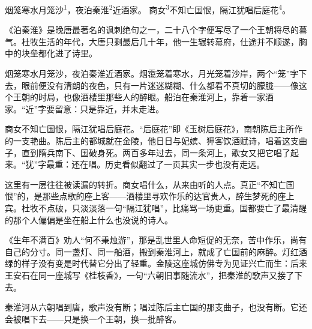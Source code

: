 
\begin{poem}
烟笼寒水月笼沙\textsuperscript{1}，夜泊秦淮\textsuperscript{2}近酒家。
商女\textsuperscript{3}不知亡国恨，隔江犹唱后庭花\textsuperscript{4}。
\end{poem}

\begin{annotations}
\end{annotations}

\begin{appreciation}
《泊秦淮》是晚唐最著名的讽刺绝句之一，二十八个字便写尽了一个王朝将尽的暮气。杜牧生活的年代，大唐只剩最后几十年，他一生辗转幕府，仕途并不顺遂，胸中的块垒都化进了诗里。

烟笼寒水月笼沙，夜泊秦淮近酒家。烟霭笼着寒水，月光笼着沙岸，两个“笼”字下去，眼前便没有清朗的夜色，只有一片迷迷糊糊、什么都看不真切的朦胧——像这个王朝的时局，也像酒楼里那些人的醉眼。船泊在秦淮河上，靠着一家酒家。“近”字要留意：只是靠近，并未走进。

商女不知亡国恨，隔江犹唱后庭花。“后庭花”即《玉树后庭花》，南朝陈后主所作的一支艳曲。陈后主的都城就在金陵，他日日与妃嫔、狎客饮酒赋诗，唱着这支曲子，直到隋兵南下、国破身死。两百多年过去，同一条河上，歌女又把它唱了起来。“犹”字最重：还在唱。历史看似翻过了一页其实一步也没有走远。

这里有一层往往被读漏的转折。商女唱什么，从来由听的人点。真正“不知亡国恨”的，是那些点歌的座上客——酒楼里寻欢作乐的达官贵人，醉生梦死的座上宾。杜牧不点破，只淡淡落一句“隔江犹唱”，比痛骂一场更重。国都要亡了最清醒的那个人偏偏是坐在船上什么也没说的诗人。

《生年不满百》劝人“何不秉烛游”，那是乱世里人命短促的无奈，苦中作乐，尚有自己的分寸。同一盏灯、同一船酒，搬到秦淮河上，就成了亡国前的麻醉。灯红酒绿的样子没有变是时代替它分出了轻重。金陵这座城仿佛专为见证兴亡而生：后来王安石在同一座城写《桂枝香》，一句“六朝旧事随流水”，把秦淮的歌声又接了下去。

秦淮河从六朝唱到唐，歌声没有断；唱过陈后主亡国的那支曲子，也没有断。它还会被唱下去——只是换一个王朝，换一批醉客。
\end{appreciation}

